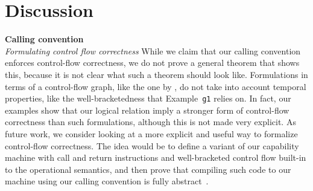 \documentclass{llncs}
\newcommand{\var}[1]{\mathit{#1}}
\newcommand{\pub}{\var{pub}}
\newcommand{\priv}{\var{priv}}
\newcommand{\futurewk}{\mathbin{\sqsupseteq}^{\var{pub}}}
\newcommand{\futurestr}{\mathbin{\sqsupseteq}^{\var{priv}}}
\begin{document}

\section{Discussion}
\label{sec:discussion}
\noindent\textbf{Calling convention}\\
\emph{Formulating control flow correctness} While we claim that our calling
convention enforces control-flow correctness, we do not prove a general theorem
that shows this, because it is not clear what such a theorem should look like.
Formulations in terms of a control-flow graph, like the one by
\cite{abadi_control-flow_2005}, do not take into account temporal properties,
like the well-bracketedness that Example~\texttt{\footnotesize{g1}} relies on.
In fact, our examples show that our logical relation imply a stronger form of
control-flow correctness than such formulations, although this is not made very
explicit. As future work, we consider looking at a more explicit and useful way
to formalize control-flow correctness. The idea would be to define a variant
of our capability machine with call and return instructions and
well-bracketed control flow built-in to the operational semantics, and then
prove that compiling such code to our machine using our calling convention is
fully abstract~\cite{abadi_protection_1998}.
\end{document}
